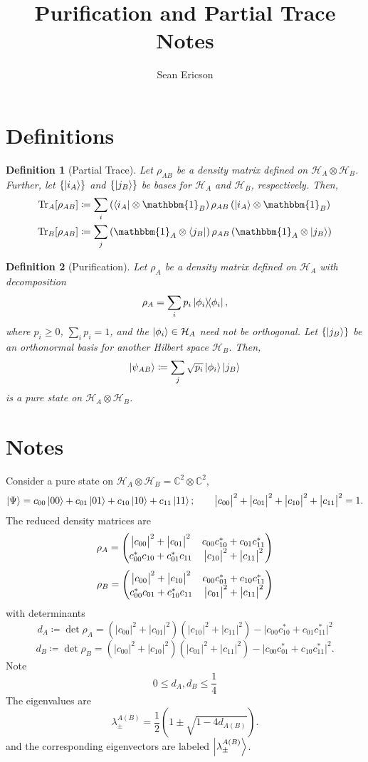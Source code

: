 \documentclass[12pt]{article}
\newcommand{\magsq}[1]{\big|#1\big|^2}
\newtheorem*{definition}{Definition}
\begin{document}
\title{Purification and Partial Trace Notes}
\author{Sean Ericson}
\maketitle

\section*{Definitions}
\begin{definition}[Partial Trace]
    Let $\rho_{AB}$ be a density matrix defined on $\mathcal{H}_A \otimes \mathcal{H}_B$. Further, let $\{\ket{i_A}\}$ and $\{\ket{j_B}\}$ be bases for $\mathcal{H}_A$ and $\mathcal{H}_B$, respectively. Then,
    \begin{align*}
        \Tr_A[\rho_{AB}] &\coloneqq \sum_i \left(\bra{i_A}\otimes\mathbbm{1}_B \right)\rho_{AB}\left(\ket{i_A}\otimes\mathbbm{1}_B\right) \\
        \Tr_B[\rho_{AB}] &\coloneqq \sum_j \left(\mathbbm{1}_A\otimes\bra{j_B}\right)\rho_{AB}\left(\mathbbm{1}_A\otimes\ket{j_B}\right)
    \end{align*}
\end{definition}
\begin{definition}[Purification]
    Let $\rho_A$ be a density matrix defined on $\mathcal{H}_A$ with decomposition
    \[ \rho_A = \sum_i p_i\dyad{\phi_i}, \]
    where $p_i \geq 0$, $\sum_i p_i = 1$, and the $\ket{\phi_i}\in\mathcal{H}_A$ need not be orthogonal. Let $\{\ket{j_B}\}$ be an orthonormal basis for another Hilbert space $\mathcal{H}_B$. Then,
    \[ \ket{\psi_{AB}} \coloneqq \sum_j \sqrt{p_i}\ket{\phi_i}\ket{j_B} \]
    is a pure state on $\mathcal{H}_A\otimes\mathcal{H}_B$.
\end{definition}

\section{Notes}
Consider a pure state on $\mathcal{H}_A\otimes\mathcal{H}_B = \mathbb{C}^2\otimes\mathbb{C}^2$,
\[ \ket{\Psi} = c_{00}\ket{00} + c_{01}\ket{01} + c_{10}\ket{10} + c_{11}\ket{11}; \qquad \magsq{c_{00}} + \magsq{c_{01}} + \magsq{c_{10}} + \magsq{c_{11}} = 1. \]
The reduced density matrices are
\[ \rho_A = \mqty(\magsq{c_{00}} + \magsq{c_{01}} & c_{00}c_{10}^* + c_{01}c_{11}^* \\ c_{00}^*c_{10} + c_{01}^*c_{11} & \magsq{c_{10}} + \magsq{c_{11}}) \]
\[ \rho_B = \mqty(\magsq{c_{00}} + \magsq{c_{10}} & c_{00}c_{01}^* + c_{10}c_{11}^* \\ c_{00}^*c_{01} + c_{10}^*c_{11} & \magsq{c_{01}} + \magsq{c_{11}}) \]
with determinants 
\[ d_A \coloneq \det\rho_A = \left(\magsq{c_{00}} + \magsq{c_{01}}\right)\left(\magsq{c_{10}} + \magsq{c_{11}}\right) - \magsq{c_{00}c_{10}^* + c_{01}c_{11}^*} \]
\[ d_B \coloneq \det\rho_B = \left(\magsq{c_{00}} + \magsq{c_{10}}\right)\left(\magsq{c_{01}} + \magsq{c_{11}}\right) - \magsq{c_{00}c_{01}^* + c_{10}c_{11}^*}. \]
Note
\[ 0 \leq d_A,d_B \leq \frac{1}{4} \]
The eigenvalues are
\[ \lambda_{\pm}^{A(B)} = \frac{1}{2}\left(1 \pm  \sqrt{1 - 4d_{A(B)}}\right). \]
and the corresponding eigenvectors are labeled $\ket{\lambda_{\pm}^{A(B)}}$.
\end{document}
